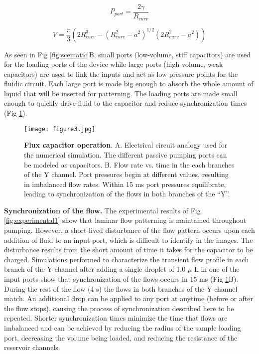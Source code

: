 \begin{equation}
P_{port} = \frac{2\gamma}{R_{curv}}
\label{eq:laplace}
\end{equation}

\begin{equation}
V = \frac{\pi}{3} (2R_{curv}^{3} - (R_{curv}^{2} - a^{2})^{1/2} (2R_{curv}^{2} - a^{2}) )
\label{eq:volumeSphericalCap}
\end{equation}

As seen in Fig \ref{fig:scematic}B, small ports (low-volume, stiff capacitors) are used for the loading ports of the device while large ports (high-volume, weak capacitors) are used to link the inputs and act as low pressure points for the fluidic circuit. Each large port is made big enough to absorb the whole amount of liquid that will be inserted for patterning. The loading ports are made small enough to quickly drive fluid to the capacitor and reduce synchronization times (Fig \ref{fig:modeling}). \\

\begin{figure}[!t]
\centering
  \texttt{[image: figure3.jpg]}
  \caption{\textbf{Flux capacitor operation}. A. Electrical circuit analogy used for the numerical simulation. The different passive pumping ports can be modeled as capacitors. B. Flow rate vs. time in the each branches of the Y channel. Port pressures begin at different values, resulting in imbalanced flow rates. Within 15 ms port pressures equilibrate, leading to synchronization of the flows in both branches of the ``Y''. }
  \label{fig:modeling}
\end{figure}

{\bf Synchronization of the flow.} The experimental results of Fig \ref{fig:experimental1} show that laminar flow patterning is maintained throughout pumping. However, a short-lived disturbance of the flow pattern occurs upon each addition of fluid to an input port, which is difficult to identify in the images. The disturbance results from the short amount of time it takes for the capacitor to be charged. Simulations performed to characterize the transient flow profile in each branch of the Y-channel after adding a single droplet of 1.0 $\mu$ L in one of the input ports show that synchronization of the flows occurs in 15 ms (Fig \ref{fig:modeling}B). During the rest of the flow (4 s) the flows in both branches of the Y channel match. An additional drop can be applied to any port at anytime (before or after the flow stops), causing the process of synchronization described here to be repeated. Shorter synchronization times minimize the time that flows are imbalanced and can be achieved by reducing the radius of the sample loading port, decreasing the volume being loaded, and reducing the resistance of the reservoir channels. \\

